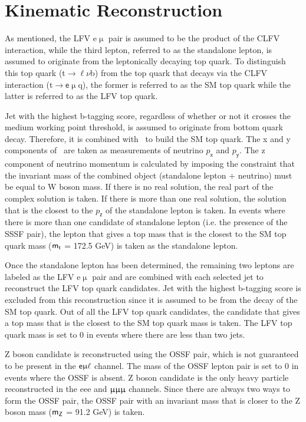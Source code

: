 \section{Kinematic Reconstruction}
\label{sec:Kin}

As mentioned, the LFV e$\upmu$ pair is assumed to be the product of the \ac{CLFV} interaction, while the third lepton, referred to as the standalone lepton, is assumed to originate from the leptonically decaying top quark. To distinguish this top quark (t$\rightarrow\ell\nu$b) from the top quark that decays via the \ac{CLFV} interaction (t$\rightarrow\textsf{e}\upmu$q), the former is referred to as the \ac{SM} top quark while the latter is referred to as the LFV top quark. 

Jet with the highest b-tagging score, regardless of whether or not it crosses the medium working point threshold, is assumed to originate from bottom quark decay. Therefore, it is combined with \MET~to build the \ac{SM} top quark. The x and y components of \MET~are taken as measurements of neutrino $p_{\textsf{x}}$ and $p_{\textsf{y}}$. The z component of neutrino momentum is calculated by imposing the constraint that the invariant mass of the combined object (standalone lepton + neutrino) must be equal to W boson mass. If there is no real solution, the real part of the complex solution is taken. If there is more than one real solution, the solution that is the closest to the $p_{\textsf{z}}$ of the standalone lepton is taken. In events where there is more than one candidate of standalone lepton (i.e. the presence of the \ac{SSSF} pair), the lepton that gives a top mass that is the closest to the \ac{SM} top quark mass ($\textsf{m}_{\textsf{t}}$ = 172.5 GeV) is taken as the standalone lepton.

Once the standalone lepton has been determined, the remaining two leptons are labeled as the LFV e$\upmu$ pair and are combined with each selected jet to reconstruct the LFV top quark candidates. Jet with the highest b-tagging score is excluded from this reconstruction since it is assumed to be from the decay of the \ac{SM} top quark. Out of all the LFV top quark candidates, the candidate that gives a top mass that is the closest to the \ac{SM} top quark mass is taken. The LFV top quark mass is set to 0 in events where there are less than two jets.

Z boson candidate is reconstructed using the \ac{OSSF} pair, which is not guaranteed to be present in the $\textsf{e}\upmu\ell$ channel. The mass of the \ac{OSSF} lepton pair is set to 0 in events where the \ac{OSSF} is absent. Z boson candidate is the only heavy particle reconstructed in the eee and $\upmu\upmu\upmu$ channels. Since there are always two ways to form the \ac{OSSF} pair, the \ac{OSSF} pair with an invariant mass that is closer to the Z boson mass ($\textsf{m}_{\textsf{Z}}$ = 91.2 GeV) is taken. 

